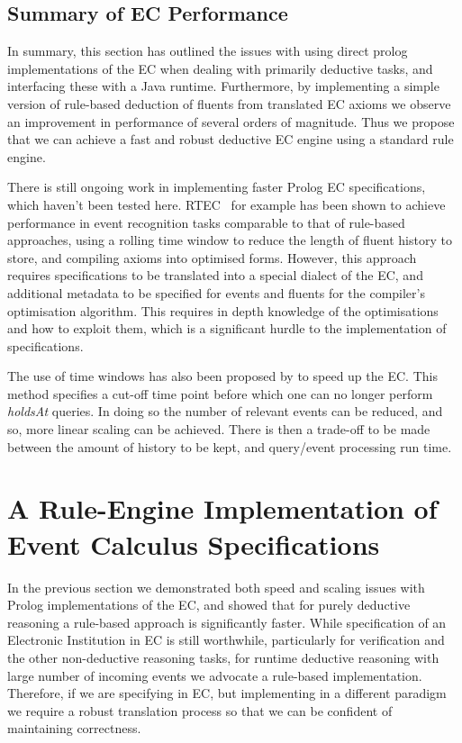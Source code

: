 \subsection{Summary of \acl{EC} Performance}

In summary, this section has outlined the issues with using direct prolog
implementations of the \ac{EC} when dealing with primarily deductive tasks,
and interfacing these with a Java runtime. Furthermore, by implementing a
simple version of rule-based deduction of fluents from translated \ac{EC}
axioms we observe an improvement in performance of several orders of
magnitude. Thus we propose that we can achieve a fast and robust deductive
\ac{EC} engine using a standard rule engine.

There is still ongoing work in implementing faster Prolog \ac{EC}
specifications, which haven't been tested here. RTEC~\citep{Artikis2012} for
example has been shown to achieve performance in event recognition tasks
comparable to that of rule-based approaches, using a rolling time window to
reduce the length of fluent history to store, and compiling axioms into
optimised forms. However, this approach requires specifications to be
translated into a special dialect of the \ac{EC}, and additional metadata to be
specified for events and fluents for the compiler's optimisation algorithm. 
This requires in depth knowledge of the optimisations and how to exploit them, 
which is a significant hurdle to the implementation of specifications.

The use of time windows has also been proposed by \citet{Carr2010} to speed up
the \ac{EC}. This method specifies a cut-off time point before which one can
no longer perform \emph{holdsAt} queries. In doing so the number of relevant
events can be reduced, and so, more linear scaling can be achieved. There is
then a trade-off to be made between the amount of history to be kept, and
query/event processing run time.

\section{A Rule-Engine Implementation of Event Calculus Specifications}

In the previous section we demonstrated both speed and scaling issues with
Prolog implementations of the \ac{EC}, and showed that for purely deductive
reasoning a rule-based approach is significantly faster. While specification
of an Electronic Institution in \ac{EC} is still worthwhile, particularly for
verification and the other non-deductive reasoning tasks, for runtime
deductive reasoning with large number of incoming events we advocate a 
rule-based implementation. Therefore, if we are specifying in \ac{EC}, but
implementing in a different paradigm we require a robust translation process
so that we can be confident of maintaining correctness.

